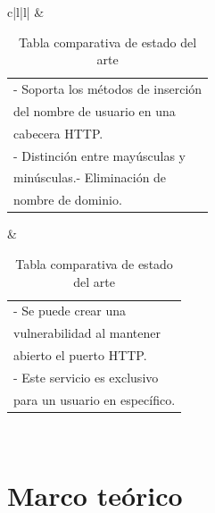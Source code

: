\documentclass[12pt, a4paper, titlepage]{report}
\begin{document}
\begin{table}[H]
\begin{tabular}{c|l|l|}
         & \begin{tabular}[c]{@{}l@{}}- Soporta los métodos de inserción \\ del nombre de usuario en una \\ cabecera HTTP.\\ - Distinción entre mayúsculas y \\ minúsculas.- Eliminación de \\ nombre de dominio.\end{tabular} & \begin{tabular}[c]{@{}l@{}}- Se puede crear una \\ vulnerabilidad al mantener \\ abierto el puerto HTTP.\\ - Este servicio es exclusivo \\ para un usuario en específico.\end{tabular} \\ \hline
        \end{tabular}
    \caption{Tabla comparativa de estado del arte}
    \label{tab:my-table}
    \end{table}
	
	    
	\chapter{\textcolor{azulescom}{Marco teórico}}
	    
	        
\end{document}

